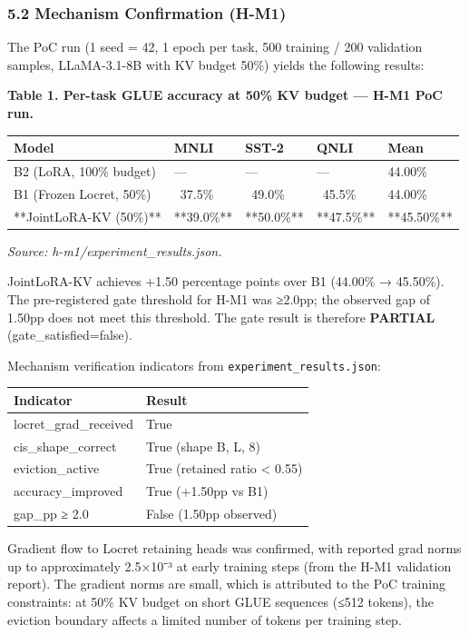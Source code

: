\subsubsection{5.2 Mechanism Confirmation (H-M1)}

The PoC run (1 seed = 42, 1 epoch per task, 500 training / 200 validation samples, LLaMA-3.1-8B with KV budget 50\%) yields the following results:

\textbf{Table 1. Per-task GLUE accuracy at 50\% KV budget — H-M1 PoC run.}

\begin{table}[htbp]
\centering
\begin{tabular}{lllll}
\toprule
Model & MNLI & SST-2 & QNLI & Mean \\
\midrule
B2 (LoRA, 100\% budget) & — & — & — & 44.00\% \\
B1 (Frozen Locret, 50\%) & ~37.5\% & ~49.0\% & ~45.5\% & 44.00\% \\
**JointLoRA-KV (50\%)** & **39.0\%** & **50.0\%** & **47.5\%** & **45.50\%** \\
\bottomrule
\end{tabular}
\end{table}

\textit{Source: h-m1/experiment_results.json.}

JointLoRA-KV achieves +1.50 percentage points over B1 (44.00\% → 45.50\%). The pre-registered gate threshold for H-M1 was ≥2.0pp; the observed gap of 1.50pp does not meet this threshold. The gate result is therefore \textbf{PARTIAL} (gate_satisfied=false).

Mechanism verification indicators from \texttt{experiment_results.json}:

\begin{table}[htbp]
\centering
\begin{tabular}{ll}
\toprule
Indicator & Result \\
\midrule
locret_grad_received & True \\
cis_shape_correct & True (shape B, L, 8) \\
eviction_active & True (retained ratio < 0.55) \\
accuracy_improved & True (+1.50pp vs B1) \\
gap_pp ≥ 2.0 & False (1.50pp observed) \\
\bottomrule
\end{tabular}
\end{table}

Gradient flow to Locret retaining heads was confirmed, with reported grad norms up to approximately 2.5×10⁻³ at early training steps (from the H-M1 validation report). The gradient norms are small, which is attributed to the PoC training constraints: at 50\% KV budget on short GLUE sequences (≤512 tokens), the eviction boundary affects a limited number of tokens per training step.

